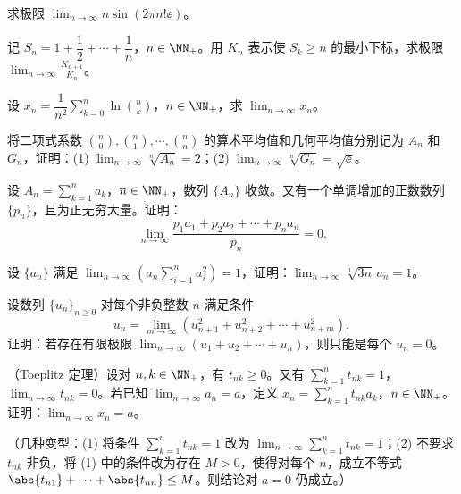 \begin{xreferenceproblem}[3]
求极限 $\displaystyle\lim_{n\to\infty}n\sin(2\pi n!\ee)$。
\end{xreferenceproblem}

\begin{xreferenceproblem}[4]
记 $S_n=1+\dfrac12+\cdots+\dfrac1n$，$n\in\NN_+$。用 $K_n$ 表示使 $S_k\ge n$ 的最小下标，求极限 $\displaystyle\lim_{n\to\infty}\frac{K_{n+1}}{K_n}$。
\end{xreferenceproblem}

\begin{xreferenceproblem}[5]
设 $x_n=\dfrac1{n^2}\displaystyle\sum_{k=0}^n\ln\binom nk$，$n\in\NN_+$，求 $\displaystyle\lim_{n\to\infty}x_n$。
\end{xreferenceproblem}

\begin{xreferenceproblem}[6]
将二项式系数 $\binom n0,\binom n1,\cdots,\binom nn$ 的算术平均值和几何平均值分别记为 $A_n$ 和 $G_n$，证明：(1) $\displaystyle\lim_{n\to\infty}\sqrt[n]{A_n}=2$；(2) $\displaystyle\lim_{n\to\infty}\sqrt[n]{G_n}=\sqrt\ee$。
\end{xreferenceproblem}

\begin{xreferenceproblem}[7]
设 $A_n=\displaystyle\sum_{k=1}^n a_k$，$n\in\NN_+$，数列 $\{A_n\}$ 收敛。又有一个单调增加的正数数列 $\{p_n\}$，且为正无穷大量。证明：
  \[
    \lim_{n\to\infty}\frac{p_1a_1+p_2a_2+\cdots+p_na_n}{p_n}=0.
  \]
\end{xreferenceproblem}

\begin{xreferenceproblem}[8]
设 $\{a_n\}$ 满足 $\displaystyle\lim_{n\to\infty}\left(a_n\sum_{i=1}^n a_i^2\right)=1$，证明：$\displaystyle\lim_{n\to\infty}\sqrt[3]{3n}\,a_n=1$。
\end{xreferenceproblem}

\begin{xreferenceproblem}[9]
设数列 $\{u_n\}_{n\ge0}$ 对每个非负整数 $n$ 满足条件
  \[
    u_n=\lim_{m\to\infty}(u_{n+1}^2+u_{n+2}^2+\cdots+u_{n+m}^2),
  \]
  证明：若存在有限极限 $\displaystyle\lim_{n\to\infty}(u_1+u_2+\cdots+u_n)$，则只能是每个 $u_n=0$。
\end{xreferenceproblem}

\begin{xreferenceproblem}[10]
（Toeplitz 定理）设对 $n,k\in\NN_+$，有 $t_{nk}\ge0$。又有 $\displaystyle\sum_{k=1}^n t_{nk}=1$，$\displaystyle\lim_{n\to\infty}t_{nk}=0$。若已知 $\displaystyle\lim_{n\to\infty}a_n=a$，定义 $x_n=\displaystyle\sum_{k=1}^n t_{nk}a_k$，$n\in\NN_+$。证明：$\displaystyle\lim_{n\to\infty}x_n=a$。

  （几种变型：(1) 将条件 $\sum_{k=1}^n t_{nk}=1$ 改为 $\displaystyle\lim_{n\to\infty}\sum_{k=1}^n t_{nk}=1$；(2) 不要求 $t_{nk}$ 非负，将 (1) 中的条件改为存在 $M>0$，使得对每个 $n$，成立不等式 $\abs{t_{n1}}+\cdots+\abs{t_{nn}}\le M$。则结论对 $a=0$ 仍成立。）
\end{xreferenceproblem}

